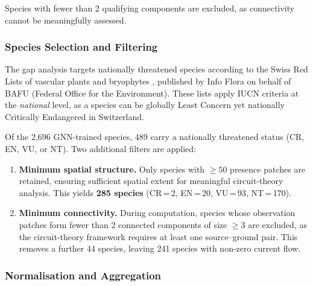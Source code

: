 Species with fewer than 2 qualifying components are excluded, as connectivity 
cannot be meaningfully assessed.

\subsubsection{Species Selection and Filtering}
\label{sec:species-selection}

The gap analysis targets nationally threatened species according
to the Swiss Red Lists of vascular plants
\citep{InfoFlora2016} and bryophytes \citep{InfoFlora2022},
published by Info Flora on behalf of BAFU (Federal Office for
the Environment). These lists apply IUCN criteria at the
\emph{national} level, as a species can be globally Least Concern
yet nationally Critically Endangered in Switzerland. 

Of the 2,696 GNN-trained species, 489 carry a nationally
threatened status (CR, EN, VU, or NT). Two additional filters
are applied:

\begin{enumerate}
    \item \textbf{Minimum spatial structure.} Only species with
    $\geq 50$ presence patches are retained, ensuring sufficient
    spatial extent for meaningful circuit-theory analysis. This
    yields \textbf{285 species} (CR\,=\,2, EN\,=\,20, VU\,=\,93,
    NT\,=\,170).

    \item \textbf{Minimum connectivity.} During computation,
    species whose observation patches form fewer than 2 connected
    components of size $\geq 3$ are excluded, as the
    circuit-theory framework requires at least one
    source--ground pair. This removes a further 44 species,
    leaving 241 species with non-zero current flow.
\end{enumerate}

\subsubsection{Normalisation and Aggregation}
\label{sec:aggregation}

